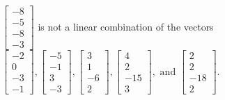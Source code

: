 \begin{exercise}
\begin{exerciseStatement}
  \end{exerciseStatement}
  \begin{exerciseAnswer}
   \(\left[\begin{array}{c}
-8 \\
-5 \\
-8 \\
-3
\end{array}\right]\) 
  	 is not  
	a linear combination of the vectors \(\left[\begin{array}{c}
-2 \\
0 \\
-3 \\
-1
\end{array}\right] , \left[\begin{array}{c}
-5 \\
-1 \\
3 \\
-3
\end{array}\right] , \left[\begin{array}{c}
3 \\
1 \\
-6 \\
2
\end{array}\right] , \left[\begin{array}{c}
4 \\
2 \\
-15 \\
3
\end{array}\right] , \text{ and } \left[\begin{array}{c}
2 \\
2 \\
-18 \\
2
\end{array}\right]\).

	
  


  \end{exerciseAnswer}
\end{exercise}